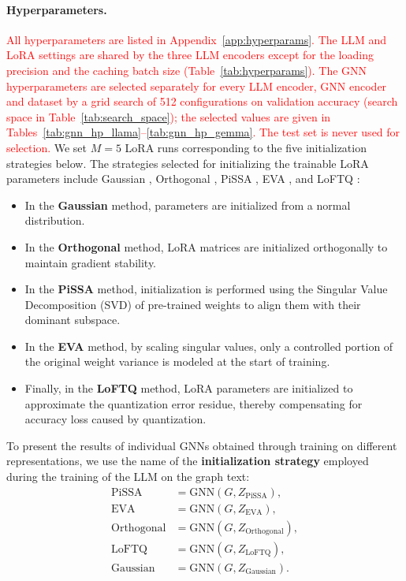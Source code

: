 \documentclass[a4paper,fleqn]{cas-sc}
\newcommand{\revone}[1]{\textcolor{red}{#1}}   %
\begin{document}
\paragraph{Hyperparameters.}
\revone{All hyperparameters are listed in Appendix~\ref{app:hyperparams}. The LLM and LoRA settings are shared by the three LLM encoders except for the loading precision and the caching batch size (Table~\ref{tab:hyperparams}). The GNN hyperparameters are selected separately for every LLM encoder, GNN encoder and dataset by a grid search of 512 configurations on validation accuracy (search space in Table~\ref{tab:search_space}); the selected values are given in Tables~\ref{tab:gnn_hp_llama}--\ref{tab:gnn_hp_gemma}. The test set is never used for selection.} We set $M=5$ LoRA runs corresponding to the five initialization strategies below.
The strategies selected for initializing the trainable LoRA parameters include Gaussian  \citep{Hu2021LoRA}, Orthogonal  \citep{zhang2025orthogonal}, PiSSA  \citep{meng2024pissa}, EVA  \citep{paischer2024eva}, and LoFTQ  \citep{li2023loftq}:
\begin{itemize}
    \item In the \textbf{Gaussian} method, parameters are initialized from a normal distribution.
    \item In the \textbf{Orthogonal} method, LoRA matrices are initialized orthogonally to maintain gradient stability.
    \item In the \textbf{PiSSA} method, initialization is performed using the Singular Value Decomposition (SVD) of pre-trained weights to align them with their dominant subspace.
    \item In the \textbf{EVA} method, by scaling singular values, only a controlled portion of the original weight variance is modeled at the start of training.
    \item Finally, in the \textbf{LoFTQ} method, LoRA parameters are initialized to approximate the quantization error residue, thereby compensating for accuracy loss caused by quantization.
\end{itemize}

To present the results of individual GNNs obtained through training on different representations, we use the name of the \textbf{initialization strategy} employed during the training of the LLM on the graph text:
\begin{align}
\text{PiSSA} &= \mathrm{GNN}(G, Z_{\text{PiSSA}}), \\
\text{EVA} &= \mathrm{GNN}(G, Z_{\text{EVA}}), \\
\text{Orthogonal} &= \mathrm{GNN}(G, Z_{\text{Orthogonal}}), \\
\text{LoFTQ} &= \mathrm{GNN}(G, Z_{\text{LoFTQ}}), \\
\text{Gaussian} &= \mathrm{GNN}(G, Z_{\text{Gaussian}}).
\end{align}
\end{document}

